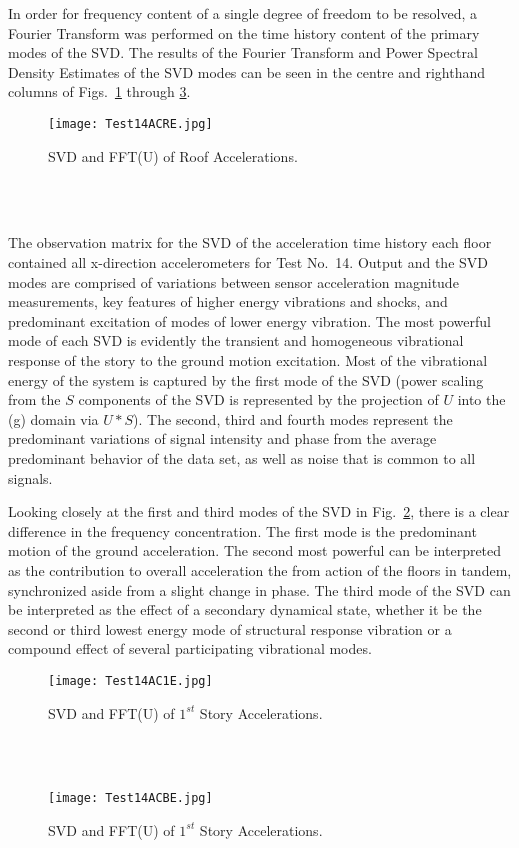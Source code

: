\documentclass{article}
\begin{document}
\medskip

\par In order for frequency content of a single degree of freedom to be resolved, a Fourier Transform was performed on the time history content of the primary modes of the SVD. The results of the Fourier Transform and Power Spectral Density Estimates of the SVD modes can be seen in the centre and righthand columns of Figs.\  \ref{fig:SVDFFTR} through  \ref{fig:SVDFFTB}.
\begin{figure}[h]
    \texttt{[image: Test14ACRE.jpg]}
    \caption{SVD and FFT(U) of Roof Accelerations.}
    \label{fig:SVDFFTR}
\end{figure}
\\
\\
\par
The observation matrix for the SVD of the acceleration time history each floor contained all x-direction accelerometers for Test No.\ 14. Output and the SVD modes are comprised of variations between sensor acceleration magnitude measurements, key features of higher energy vibrations and shocks, and predominant excitation of modes of lower energy vibration. The most powerful mode of each SVD is evidently the transient and homogeneous vibrational response of the story to the ground motion excitation. Most of the vibrational energy of the system is captured by the first mode of the SVD (power scaling from the $S$ components of the SVD is represented by the projection of $U$ into the (g) domain via $U*S$). The second, third and fourth modes represent the predominant variations of signal intensity and phase from the average predominant  behavior of the  data set, as well as noise that is common to all signals. 

\medskip

\par 
Looking closely at the first and third modes of the SVD in Fig.\  \ref{fig:SVDFFT1}, there is a clear difference in the frequency concentration. The first mode is the predominant motion of the ground acceleration. The second most powerful can be interpreted as the contribution to overall acceleration the from action of the floors in tandem, synchronized aside from a slight change in phase. The third mode of the SVD can be interpreted as the effect of a secondary dynamical state, whether it be the second or third lowest energy mode of structural response vibration or a compound effect of several participating vibrational modes. 
\\
\begin{figure}[h]
    
    \texttt{[image: Test14AC1E.jpg]}
    \caption{SVD and FFT(U) of $1^{st}$ Story Accelerations.}
    \label{fig:SVDFFT1}
\end{figure}
\\
\\
\begin{figure}[h]
    
    \texttt{[image: Test14ACBE.jpg]}
    \caption{SVD and FFT(U) of $1^{st}$ Story Accelerations.}
    \label{fig:SVDFFTB}
\end{figure}
\FloatBarrier
\end{document}
